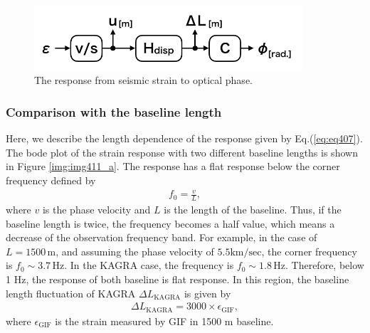 \begin{figure}[h]
  \centering
  \includegraphics[width=10.0cm]{./img_chap4/img411.png}
  \caption{The response from seismic strain to optical phase.} \label{img:img411}
\end{figure}

\subsubsection{Comparison with the baseline length}
Here, we describe the length dependence of the response given by Eq.(\ref{eq:eq407}). The bode plot of the strain response with two different baseline lengths is shown in Figure  \ref{img:img411_a}. The response has a flat response below the corner frequency defined by 
\begin{eqnarray}
  f_0 = \frac{v}{L},
\end{eqnarray}
where $v$ is the phase velocity and $L$ is the length of the baseline. Thus, if the baseline length is twice, the frequency becomes a half value, which means a decrease of the observation frequency band. For example, in the case of $L=1500\,\mathrm{m}$, and assuming the phase velocity of $5.5 \mathrm{km/sec}$, the corner frequency is $f_0\sim3.7\,\mathrm{Hz}$. In the KAGRA case, the frequency is $f_0\sim1.8\,\mathrm{Hz}$. Therefore, below 1 Hz, the response of both baseline is flat response. In this region, the baseline length fluctuation of KAGRA $\Delta{L_{\mathrm{KAGRA}}}$ is given by
\begin{eqnarray}
  \Delta{L_{\mathrm{KAGRA}}} = 3000\times\epsilon_{\mathrm{GIF}},
\end{eqnarray}
where $\epsilon_{\mathrm{GIF}}$ is the strain measured by GIF in 1500 m baseline.


